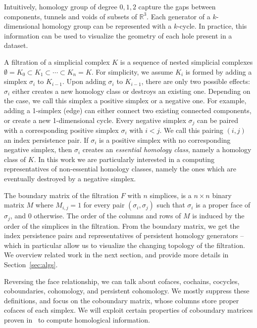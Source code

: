 Intuitively, homology group of degree $0,1,2$ capture the gaps between components, tunnels and voids of subsets of $\mathbb{R}^3$. Each generator of a $k$-dimensional homology group can be represented with a $k$-cycle. In practice, this information can be used to visualize the geometry of each hole present in a dataset.


A filtration of a simplicial complex $K$ is a sequence of nested simplicial complexes $\emptyset = K_0 \subset K_1 \subset\cdots\subset K_n=K$. For simplicity, we assume $K_i$ is formed by adding a simplex $\sigma_i$ to $K_{i-1}$. Upon adding $\sigma_i$ to $K_{i-1}$, there are only two possible effects: $\sigma_{i}$ either creates a new homology class or destroys an existing one. Depending on the case, we call this simplex a positive simplex or a negative one. For example, adding a 1-simplex (edge) can either connect two existing connected components, or create a new 1-dimensional cycle. Every negative simplex $\sigma_j$ can be paired with a corresponding positive simplex $\sigma_i$ with $i<j$. We call this pairing $(i,j)$ an index persistence pair. If $\sigma_i$ is a positive simplex with no corresponding negative simplex, then $\sigma_i$ creates an \textit{essential homology class}, namely a homology class of $K$. In this work we are particularly interested in a computing representatives of non-essential homology classes, namely the ones which are eventually destroyed by a negative simplex.

 The boundary matrix of the filtration $F$ with $n$ simplices, is a $n\times n$ binary matrix $M$ where $M_{i,j}=1$ for every pair $(\sigma_i,\sigma_j)$ such that $\sigma_i$ is a proper face of $\sigma_j$, and $0$ otherwise. The order of the columns and rows of $M$ is induced by the order of the simplices in the filtration. From the boundary matrix, we get the index persistence pairs and representatives of persistent homology generators -- which in particular allow us to visualize the changing topology of the filtration. We overview related work in the next section, and provide more details in Section~\ref{sec:algs}.

Reversing the face relationship, we can talk about cofaces, cochains, cocycles, coboundaries, cohomology, and persistent cohomology. We mostly suppress these definitions, and focus on the coboundary matrix, whose columns store proper cofaces of each simplex. We will exploit certain properties of coboundary matrices proven in~\cite{deSilva_2011} to compute homological information. 


